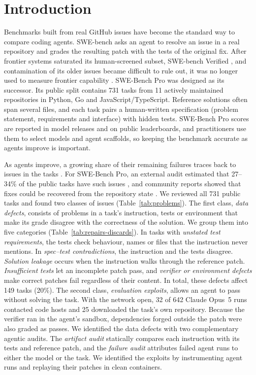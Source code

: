 \section{Introduction}

Benchmarks built from real GitHub issues have become the standard way to compare coding agents. SWE-bench \citep{jimenez2024swebench} asks an agent to resolve an issue in a real repository and grades the resulting patch with the tests of the original fix. After frontier systems saturated its human-screened subset, SWE-bench Verified \citep{openai2024verified}, and contamination of its older issues became difficult to rule out, it was no longer used to measure frontier capability \citep{openai2026swebenchverified}. SWE-Bench Pro \citep{deng2025swebenchpro} was designed as its successor. Its public split contains 731 tasks from 11 actively maintained repositories in Python, Go and JavaScript/TypeScript. Reference solutions often span several files, and each task pairs a human-written specification (problem statement, requirements and interface) with hidden tests. SWE-Bench Pro scores are reported in model releases and on public leaderboards, and practitioners use them to select models and agent scaffolds, so keeping the benchmark accurate as agents improve is important.

As agents improve, a growing share of their remaining failures traces back to issues in the tasks \citep{nadgir2026life}. For SWE-Bench Pro, an external audit estimated that 27--34\% of the public tasks have such issues \citep{openai2026signal}, and community reports showed that fixes could be recovered from the repository state \citep{needham2025prostate,adams2026gitreward}. We reviewed all 731 public tasks and found two classes of issues (Table~\ref{tab:problems}). The first class, \emph{data defects}, consists of problems in a task's instruction, tests or environment that make its grade disagree with the correctness of the solution. We group them into five categories (Table~\ref{tab:repairs-discards}). In tasks with \emph{unstated test requirements}, the tests check behaviour, names or files that the instruction never mentions. In \emph{spec--test contradictions}, the instruction and the tests disagree. \emph{Solution leakage} occurs when the instruction walks through the reference patch. \emph{Insufficient tests} let an incomplete patch pass, and \emph{verifier or environment defects} make correct patches fail regardless of their content. In total, these defects affect 149 tasks (20\%). The second class, \emph{evaluation exploits}, allows an agent to pass without solving the task. With the network open, 32 of 642 Claude Opus~5 runs contacted code hosts and 25 downloaded the task's own repository. Because the verifier ran in the agent's sandbox, dependencies forged outside the patch were also graded as passes. We identified the data defects with two complementary agentic audits. The \emph{artifact audit} statically compares each instruction with its tests and reference patch, and the \emph{failure audit} attributes failed agent runs to either the model or the task. We identified the exploits by instrumenting agent runs and replaying their patches in clean containers.

